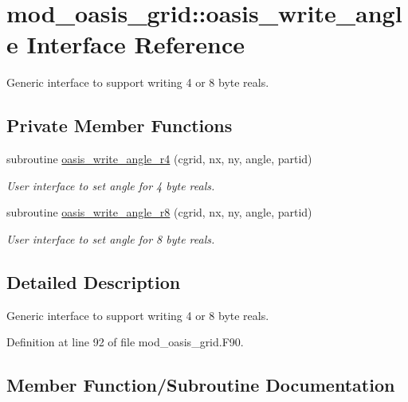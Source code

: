 \hypertarget{interfacemod__oasis__grid_1_1oasis__write__angle}{}\section{mod\+\_\+oasis\+\_\+grid\+:\+:oasis\+\_\+write\+\_\+angle Interface Reference}
\label{interfacemod__oasis__grid_1_1oasis__write__angle}


Generic interface to support writing 4 or 8 byte reals.  


\subsection*{Private Member Functions}
\begin{DoxyCompactItemize}
\item 
subroutine \hyperlink{interfacemod__oasis__grid_1_1oasis__write__angle_ad29c223ca87f1f54d042bce0a9b9e90d}{oasis\+\_\+write\+\_\+angle\+\_\+r4} (cgrid, nx, ny, angle, partid)
\begin{DoxyCompactList}\small\item\em User interface to set angle for 4 byte reals. \end{DoxyCompactList}\item 
subroutine \hyperlink{interfacemod__oasis__grid_1_1oasis__write__angle_a82a80c2eeb39ddca783d7868d92b6f6d}{oasis\+\_\+write\+\_\+angle\+\_\+r8} (cgrid, nx, ny, angle, partid)
\begin{DoxyCompactList}\small\item\em User interface to set angle for 8 byte reals. \end{DoxyCompactList}\end{DoxyCompactItemize}


\subsection{Detailed Description}
Generic interface to support writing 4 or 8 byte reals. 

Definition at line 92 of file mod\+\_\+oasis\+\_\+grid.\+F90.



\subsection{Member Function/\+Subroutine Documentation}
\mbox{\label{interfacemod__oasis__grid_1_1oasis__write__angle_ad29c223ca87f1f54d042bce0a9b9e90d}} 
